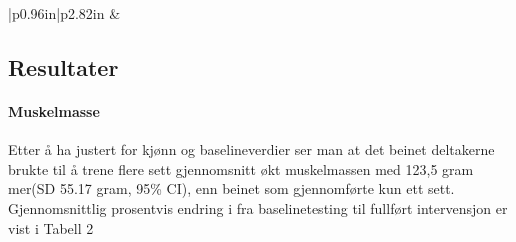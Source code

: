\documentclass[
]{article}
\begin{document}
\begin{longtable}[c]{|p{0.96in}|p{2.82in}}
 &  \\

\noalign{\global\setlength{\arrayrulewidth}{2pt}}



\end{longtable}

\hypertarget{resultater}{%
\subsection{Resultater}\label{resultater}}

\hypertarget{muskelmasse}{%
\paragraph{Muskelmasse}\label{muskelmasse}}

Etter å ha justert for kjønn og baselineverdier ser man at det beinet
deltakerne brukte til å trene flere sett gjennomsnitt økt muskelmassen
med 123,5 gram mer(SD 55.17 gram, 95\% CI), enn beinet som gjennomførte
kun ett sett. Gjennomsnittlig prosentvis endring i fra baselinetesting
til fullført intervensjon er vist i Tabell 2

\providecommand{\docline}[3]{\noalign{\global\setlength{\arrayrulewidth}{#1}}\arrayrulecolor[HTML]{#2}\cline{#3}}

\setlength{\tabcolsep}{2pt}

\renewcommand*{\arraystretch}{1.5}
\end{document}
